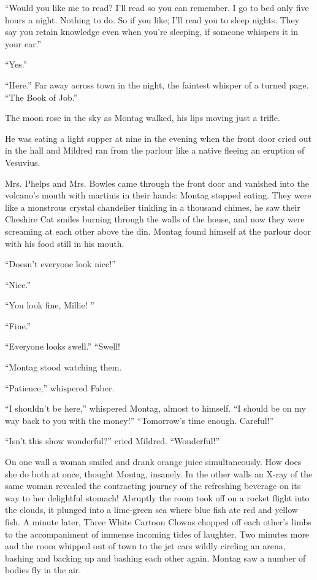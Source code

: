 \documentclass[11pt,openany]{book}
\begin{document}
``Would you like me to read? I'll read so you can remember. I go to bed only five hours a night. Nothing to do. So if you like; I'll read you to sleep nights. They say you retain knowledge even when you're sleeping, if someone whispers it in your ear.''

``Yes.''

``Here.'' Far away across town in the night, the faintest whisper of a turned page. ``The Book of Job.''

The moon rose in the sky as Montag walked, his lips moving just a trifle.

He was eating a light supper at nine in the evening when the front door cried out in the hall and Mildred ran from the parlour like a native fleeing an eruption of Vesuvius.

Mrs. Phelps and Mrs. Bowles came through the front door and vanished into the volcano's mouth with martinis in their hands: Montag stopped eating. They were like a monstrous crystal chandelier tinkling in a thousand chimes, he saw their Cheshire Cat smiles burning through the walls of the house, and now they were screaming at each other above the din. Montag found himself at the parlour door with his food still in his mouth.

``Doesn't everyone look nice!''

``Nice.''

``You look fine, Millie! ''

``Fine.''

``Everyone looks swell.'' ``Swell!

``Montag stood watching them.

``Patience,'' whispered Faber.

``I shouldn't be here,'' whispered Montag, almost to himself. ``I should be on my way back to you with the money!'' ``Tomorrow's time enough. Careful!''

``Isn't this show wonderful?'' cried Mildred. ``Wonderful!''

On one wall a woman smiled and drank orange juice simultaneously. How does she do both at once, thought Montag, insanely. In the other walls an X-ray of the same woman revealed the contracting journey of the refreshing beverage on its way to her delightful stomach! Abruptly the room took off on a rocket flight into the clouds, it plunged into a lime-green sea where blue fish ate red and yellow fish. A minute later, Three White Cartoon Clowns chopped off each other's limbs to the accompaniment of immense incoming tides of laughter. Two minutes more and the room whipped out of town to the jet cars wildly circling an arena, bashing and backing up and bashing each other again. Montag saw a number of bodies fly in the air.
\end{document}
